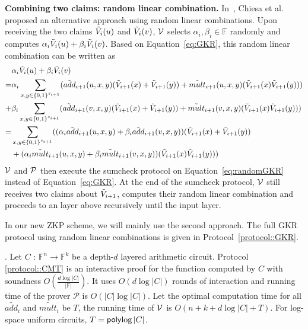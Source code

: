 \smallskip\noindent\textbf{Combining two claims: random linear combination.}  In~\cite{zksumcheck}, Chiesa et al. proposed an alternative approach using random linear combinations. Upon receiving the two claims $\tV_i(u)$ and $\tV_i(v)$, $\V$ selects $\alpha_i, \beta_i\in\mathbb{F}$ randomly and computes $\alpha_i\tV_i(u)+\beta_i\tV_i(v)$. Based on Equation~\ref{eq:GKR}, this random linear combination can be written as
{\footnotesize
\begin{align}\label{eq:randomGKR}
&\alpha_i\tV_i(u)+\beta_i\tV_i(v)\nonumber\\
=&\alpha_i\sum_{x, y \in\binary^{s_{i+1}}}(\tadd_{i+1}(u,x,y)(\tV_{i+1}(x)+\tV_{i+1}(y))+\tmult_{i+1}(u,x,y)(\tV_{i+1}(x)\tV_{i+1}(y)))\nonumber\\+&\beta_i\sum_{x, y \in\binary^{s_{i+1}}}(\tadd_{i+1}(v,x,y)(\tV_{i+1}(x)+\tV_{i+1}(y))+\tmult_{i+1}(v,x,y)(\tV_{i+1}(x)\tV_{i+1}(y)))\nonumber\\
=&\sum_{x, y \in\binary^{s_{i+1}}}((\alpha_i\tadd_{i+1}(u,x,y)+\beta_i\tadd_{i+1}(v,x,y))(\tV_{i+1}(x)+\tV_{i+1}(y))\nonumber\\
&+(\alpha_i\tmult_{i+1}(u,x,y)+\beta_i\tmult_{i+1}(v,x,y))(\tV_{i+1}(x)\tV_{i+1}(y)))
\end{align}
}
$\V$ and $\P$ then execute the sumcheck protocol on Equation~\ref{eq:randomGKR} instead of Equation~\ref{eq:GKR}. At the end of the sumcheck protocol, $\V$ still receives two claims about $\tV_{i+1}$, computes their random linear combination and proceeds to an layer above recursively until the input layer.

In our new ZKP scheme, we will mainly use the second approach. The full GKR protocol using random linear combinations is given in Protocol~\ref{protocol::GKR}.

\begin{theorem}\cite{VSA13}\cite{JT_Thesis}\cite{CMT}\cite{GKR}. Let $C$ : $\mathbb{F}^n \rightarrow \mathbb{F}^k$ be a depth-$d$ layered arithmetic circuit. Protocol \ref{protocol::CMT} is an interactive proof for the function computed by $C$ with soundness $O(\frac{d\log {|C|}}{|\mathbb{F}|})$. It uses $O(d \log |C|)$ rounds of interaction and running time of the prover $\mathcal{P}$ is $O(|C|\log |C|)$. Let the optimal computation time for all $\tilde{add_i}$ and $\tilde{mult_i}$ be $T$, the running time of $\V$ is $O(n+k+d\log |C|+T)$. For log-space uniform circuits, $T=\poly{\log |C|}$.
\end{theorem}